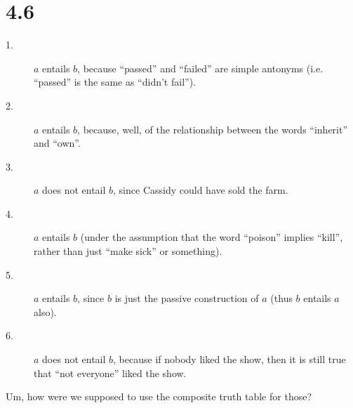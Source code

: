 \documentclass[12pt]{article}
\begin{document}
\section*{4.6}
\begin{description}
\item[1.] $a$ entails $b$, because ``passed'' and ``failed'' are simple
antonyms (i.e. ``passed'' is the same as ``didn't fail'').
\item[2.] $a$ entails $b$, because, well, of the relationship between
the words ``inherit'' and ``own''.
\item[3.] $a$ does not entail $b$, since Cassidy could have sold the
farm.
\item[4.] $a$ entails $b$ (under the assumption that the word ``poison''
implies ``kill'', rather than just ``make sick'' or something).
\item[5.] $a$ entails $b$, since $b$ is just the passive construction of
$a$ (thus $b$ entails $a$ also).
\item[6.] $a$ does not entail $b$, because if nobody liked the show,
then it is still true that ``not everyone'' liked the show.
\end{description}

Um, how were we supposed to use the composite truth table for those?
\end{document}

